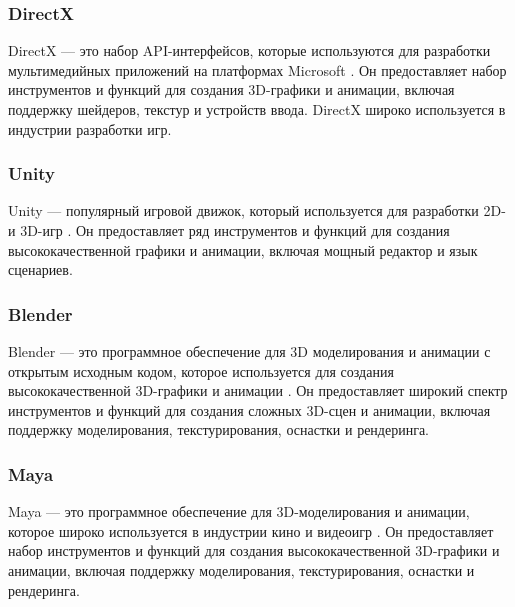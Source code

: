 \subsubsection{DirectX}

DirectX — это набор API-интерфейсов, которые используются для разработки мультимедийных приложений на платформах Microsoft \cite{DirectX_offc}. Он предоставляет набор инструментов и функций для создания 3D-графики и анимации, включая поддержку шейдеров, текстур и устройств ввода. DirectX широко используется в индустрии разработки игр. 

\subsubsection{Unity}

Unity — популярный игровой движок, который используется для разработки 2D- и 3D-игр \cite{Unity_offc}. Он предоставляет ряд инструментов и функций для создания высококачественной графики и анимации, включая мощный редактор и язык сценариев. 

\subsubsection{Blender}

Blender — это программное обеспечение для 3D моделирования и анимации с открытым исходным кодом, которое используется для создания высококачественной 3D-графики и анимации \cite{Blender_offc}. Он предоставляет широкий спектр инструментов и функций для создания сложных 3D-сцен и анимации, включая поддержку моделирования, текстурирования, оснастки и рендеринга. 

\subsubsection{Maya}

Maya --- это программное обеспечение для 3D-моделирования и анимации, которое широко используется в индустрии кино и видеоигр \cite{Maya_offc}. Он предоставляет набор инструментов и функций для создания высококачественной 3D-графики и анимации, включая поддержку моделирования, текстурирования, оснастки и рендеринга. 